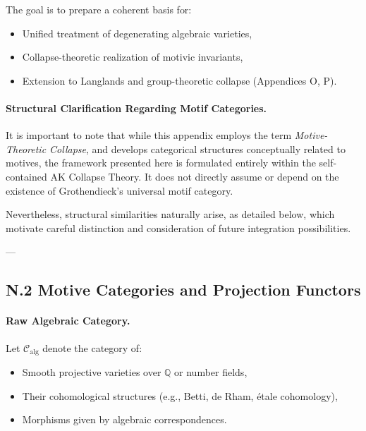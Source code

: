 \documentclass[11pt]{article}
\begin{document}
The goal is to prepare a coherent basis for:
\begin{itemize}
  \item Unified treatment of degenerating algebraic varieties,
  \item Collapse-theoretic realization of motivic invariants,
  \item Extension to Langlands and group-theoretic collapse (Appendices O, P).
\end{itemize}

\paragraph{Structural Clarification Regarding Motif Categories.}

It is important to note that while this appendix employs the term \textit{Motive-Theoretic Collapse}, and develops categorical structures conceptually related to motives, the framework presented here is formulated entirely within the self-contained AK Collapse Theory. It does not directly assume or depend on the existence of Grothendieck's universal motif category.

Nevertheless, structural similarities naturally arise, as detailed below, which motivate careful distinction and consideration of future integration possibilities.

---

\subsection*{N.2 Motive Categories and Projection Functors}

\paragraph{Raw Algebraic Category.}
Let \( \mathcal{C}_{\mathrm{alg}} \) denote the category of:
\begin{itemize}
  \item Smooth projective varieties over \( \mathbb{Q} \) or number fields,
  \item Their cohomological structures (e.g., Betti, de Rham, étale cohomology),
  \item Morphisms given by algebraic correspondences.
\end{itemize}
\end{document}
